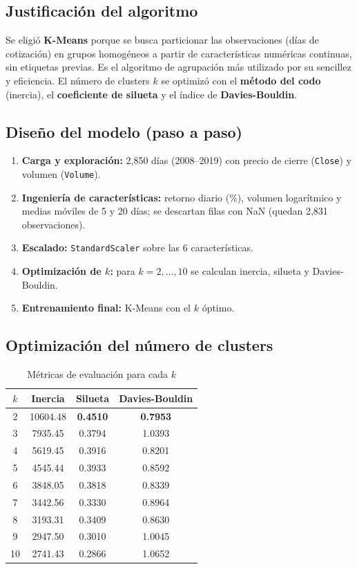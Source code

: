 \documentclass[12pt,a4paper]{article}
\begin{document}
\subsection{Justificación del algoritmo}
Se eligió \textbf{K-Means} porque se busca particionar las observaciones (días de
cotización) en grupos homogéneos a partir de características numéricas continuas, sin
etiquetas previas. Es el algoritmo de agrupación más utilizado por su sencillez y
eficiencia. El número de clusters $k$ se optimizó con el \textbf{método del codo}
(inercia), el \textbf{coeficiente de silueta} y el índice de \textbf{Davies-Bouldin}.

\subsection{Diseño del modelo (paso a paso)}
\begin{enumerate}[itemsep=2pt]
\item \textbf{Carga y exploración:} 2,850 días (2008--2019) con precio de cierre
      (\texttt{Close}) y volumen (\texttt{Volume}).
\item \textbf{Ingeniería de características:} retorno diario (\%), volumen
      logarítmico y medias móviles de 5 y 20 días; se descartan filas con NaN
      (quedan 2,831 observaciones).
\item \textbf{Escalado:} \texttt{StandardScaler} sobre las 6 características.
\item \textbf{Optimización de $k$:} para $k=2,\dots,10$ se calculan inercia,
      silueta y Davies-Bouldin.
\item \textbf{Entrenamiento final:} K-Means con el $k$ óptimo.
\end{enumerate}

\subsection{Optimización del número de clusters}
\begin{table}[H]
\centering
\caption{Métricas de evaluación para cada $k$}
\begin{tabular}{cccc}
\toprule
$k$ & \textbf{Inercia} & \textbf{Silueta} & \textbf{Davies-Bouldin} \\
\midrule
2 & 10604.48 & \textbf{0.4510} & \textbf{0.7953} \\
3 & 7935.45 & 0.3794 & 1.0393 \\
4 & 5619.45 & 0.3916 & 0.8201 \\
5 & 4545.44 & 0.3933 & 0.8592 \\
6 & 3848.05 & 0.3818 & 0.8339 \\
7 & 3442.56 & 0.3330 & 0.8964 \\
8 & 3193.31 & 0.3409 & 0.8630 \\
9 & 2947.50 & 0.3010 & 1.0045 \\
10 & 2741.43 & 0.2866 & 1.0652 \\
\bottomrule
\end{tabular}
\end{table}
\end{document}
